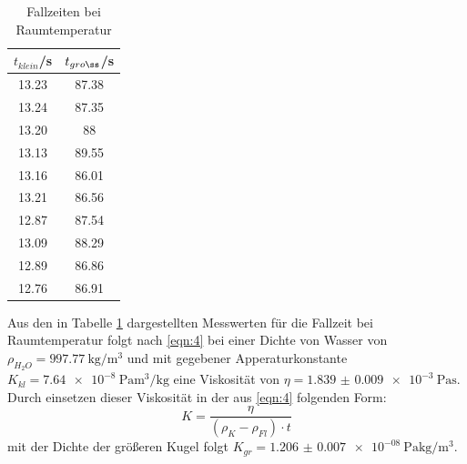 \begin{table}[h]
  \centering
  \caption{Fallzeiten bei Raumtemperatur}
  \label{tab:3}
  \begin{tabular}{c c}
    \toprule
    $t_{klein}$/\si{\second} & $t_{gro\ss}$/\si{\second} \\
    \midrule
    13.23 & 87.38 \\
    13.24 & 87.35 \\
    13.20 & 88 \\
    13.13 & 89.55 \\
    13.16 & 86.01 \\
    13.21 & 86.56 \\
    12.87 & 87.54 \\
    13.09 & 88.29 \\
    12.89 & 86.86 \\
    12.76 & 86.91 \\
    \bottomrule
  \end{tabular}
\end{table}
Aus den in Tabelle \ref{tab:3} dargestellten Messwerten für die Fallzeit bei Raumtemperatur
folgt nach \eqref{eqn:4} bei einer Dichte von Wasser von $\rho_{H_2O} = \SI[per-mode=reciprocal]{997.77}{\kilo\gram\per\cubic\metre}$
und mit gegebener Apperaturkonstante $K_{kl} = \SI[per-mode=reciprocal]{7.64e-8}{\pascal\cubic\metre\per\kilo\gram}$
eine Viskosität von $\eta = \SI{1.839(9)e-3}{\pascal\second}$.
Durch einsetzen dieser Viskosität in der aus \eqref{eqn:4} folgenden Form:
\begin{equation}
  K = \frac{\eta}{(\rho_K - \rho_{Fl}) \cdot t}
\end{equation}
mit der Dichte der größeren Kugel folgt $K_{gr} = \SI[per-mode=reciprocal]{1.206(7)e-08}{\pascal\kilo\gram\per\cubic\metre}$.

